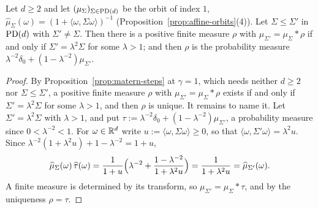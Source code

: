 \begin{proposition}\label{prop:matern-cross-shape}
Let $d \ge 2$ and let $(\mu_\Sigma)_{\Sigma\in\mathrm{PD}(d)}$ be the \Matern{} orbit of index $1$,
$\widehat\mu_\Sigma(\omega) = (1 + \langle\omega,\Sigma\omega\rangle)^{-1}$
(Proposition~\ref{prop:affine-orbits}(4)). Let $\Sigma \le \Sigma'$ in $\mathrm{PD}(d)$ with $\Sigma' \ne \Sigma$.
Then there is a positive finite measure $\rho$ with $\mu_{\Sigma'} = \mu_\Sigma * \rho$ if and only
if $\Sigma' = \lambda^2\Sigma$ for some $\lambda > 1$; and then $\rho$ is the probability measure
$\lambda^{-2}\delta_0 + (1-\lambda^{-2})\mu_{\Sigma'}$.
\end{proposition}

\begin{proof}
By Proposition~\ref{prop:matern-steps} at $\gamma = 1$, which needs neither $d \ge 2$ nor $\Sigma \le \Sigma'$,
a positive finite measure $\rho$ with $\mu_{\Sigma'} = \mu_\Sigma * \rho$ exists if and only if
$\Sigma' = \lambda^2\Sigma$ for some $\lambda > 1$, and then $\rho$ is unique. It remains to name
it. Let $\Sigma' = \lambda^2\Sigma$ with $\lambda > 1$, and put
$\tau := \lambda^{-2}\delta_0 + (1-\lambda^{-2})\mu_{\Sigma'}$, a probability measure since
$0 < \lambda^{-2} < 1$. For $\omega \in \mathbb{R}^d$ write $u := \langle\omega,\Sigma\omega\rangle \ge 0$, so
that $\langle\omega,\Sigma'\omega\rangle = \lambda^2u$. Since
$\lambda^{-2}(1 + \lambda^2u) + 1 - \lambda^{-2} = 1 + u$,
\[
  \widehat\mu_\Sigma(\omega)\,\widehat\tau(\omega)
  = \frac{1}{1+u}\Bigl(\lambda^{-2} + \frac{1-\lambda^{-2}}{1+\lambda^2u}\Bigr)
  = \frac{1}{1+\lambda^2u} = \widehat\mu_{\Sigma'}(\omega) .
\]
A finite measure is determined by its transform, so $\mu_{\Sigma'} = \mu_\Sigma * \tau$, and by the
uniqueness $\rho = \tau$.
\end{proof}

